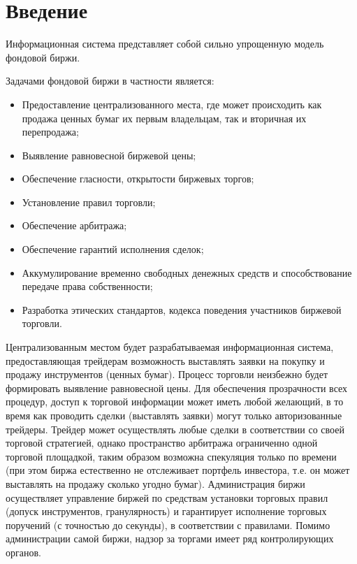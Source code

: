 \documentclass[a4paper, 12pt]{article}        %
\begin{document}
\tableofcontents


\newpage
\section*{Введение}

Информационная система представляет собой сильно упрощенную модель фондовой биржи.

Задачами фондовой биржи в частности является:
\begin{itemize}
\item Предоставление централизованного места, где может происходить как продажа ценных бумаг их первым владельцам, так и вторичная их перепродажа;
\item Выявление равновесной биржевой цены;
\item Обеспечение гласности, открытости биржевых торгов;
\item Установление правил торговли;
\item Обеспечение арбитража;
\item Обеспечение гарантий исполнения сделок;
\item Аккумулирование временно свободных денежных средств и способствование передаче права собственности;
\item Разработка этических стандартов, кодекса поведения участников биржевой торговли.
\end{itemize}

Централизованным местом будет разрабатываемая информационная система, предоставляющая трейдерам возможность выставлять заявки на покупку и продажу инструментов (ценных бумаг). Процесс торговли неизбежно будет формировать выявление равновесной цены. Для обеспечения прозрачности всех процедур, доступ к торговой информации может иметь любой желающий, в то время как проводить сделки (выставлять заявки) могут только авторизованные трейдеры. Трейдер может осуществлять любые сделки в соответствии со своей торговой стратегией, однако пространство арбитража ограниченно одной торговой площадкой, таким образом возможна спекуляция только по времени (при этом биржа естественно не отслеживает портфель инвестора, т.е. он может выставлять на продажу сколько угодно бумаг). Администрация биржи осуществляет управление биржей по средствам установки торговых правил (допуск инструментов, гранулярность) и гарантирует исполнение торговых поручений (с точностью до секунды), в соответствии с правилами. Помимо администрации самой биржи, надзор за торгами имеет ряд контролирующих органов.
\end{document}
